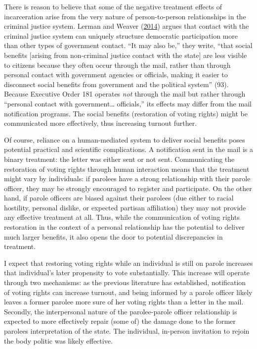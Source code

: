 \documentclass[
  12pt,
]{article}
\begin{document}
There is reason to believe that some of the negative treatment effects of incarceration arise from the very nature of person-to-person relationships in the criminal justice system. Lerman and Weaver (\protect\hyperlink{ref-Lerman2014}{2014}) argues that contact with the criminal justice system can uniquely structure democratic participation more than other types of government contact. ``It may also be,'' they write, ``that social benefits {[}arising from non-criminal justice contact with the state{]} are less visible to citizens because they often occur through the mail, rather than through personal contact with government agencies or officials, making it easier to disconnect social benefits from government and the political system'' (93). Because Executive Order 181 operates \emph{not} through the mail but rather through ``personal contact with government\ldots{} officials,'' its effects may differ from the mail notification programs. The social benefits (restoration of voting rights) might be communicated more effectively, thus increasing turnout further.

Of course, reliance on a human-mediated system to deliver social benefits poses potential practical and scientific complications. A notification sent in the mail is a binary treatment: the letter was either sent or not sent. Communicating the restoration of voting rights through human interaction means that the treatment might vary by individuals: if parolees have a strong relationship with their parole officer, they may be strongly encouraged to register and participate. On the other hand, if parole officers are biased against their parolees (due either to racial hostility, personal dislike, or expected partisan affiliation) they may not provide any effective treatment at all. Thus, while the communication of voting rights restoration in the context of a personal relationship has the potential to deliver much larger benefits, it also opens the door to potential discrepancies in treatment.

I expect that restoring voting rights while an individual is still on parole increases that individual's later propensity to vote substantially. This increase will operate through two mechanisms: as the previous literature has established, notification of voting rights can increase turnout, and being informed by a parole officer likely leaves a former parolee more sure of her voting rights than a letter in the mail. Secondly, the interpersonal nature of the parolee-parole officer relationship is expected to more effectively repair (some of) the damage done to the former parolees interpretation of the state. The individual, in-person invitation to rejoin the body politic was likely effective.
\end{document}
